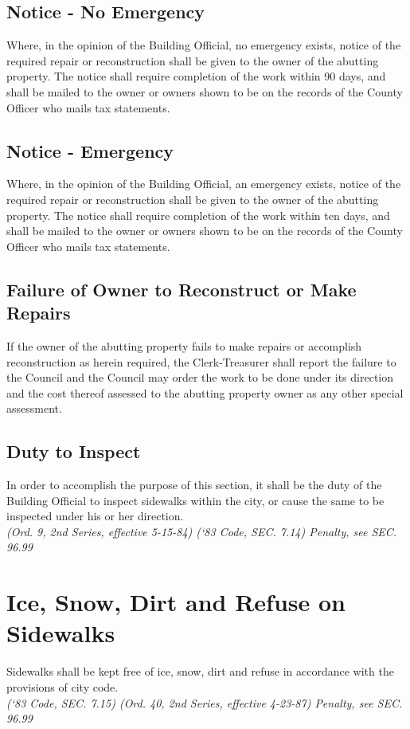 \subsection{Notice - No Emergency}
Where, in the opinion of the Building Official, no emergency exists, notice of the required repair or reconstruction shall be given to the owner of the abutting property.  The notice shall require completion of the work within 90 days, and shall be mailed to the owner or owners shown to be on the records of the County Officer who mails tax statements.
\subsection{Notice - Emergency}
Where, in the opinion of the Building Official, an emergency exists, notice of the required repair or reconstruction shall be given to the owner of the abutting property.  The notice shall require completion of the work within ten days, and shall be mailed to the owner or owners shown to be on the records of the County Officer who mails tax statements.
\subsection{Failure of Owner to Reconstruct or Make Repairs}
If the owner of the abutting property fails to make repairs or accomplish reconstruction as herein required, the Clerk-Treasurer shall report the failure to the Council and the Council may order the work to be done under its direction and the cost thereof assessed to the abutting property owner as any other special assessment.
\subsection{Duty to Inspect}
In order to accomplish the purpose of this section, it shall be the duty of the Building Official to inspect sidewalks within the city, or cause the same to be inspected under his or her direction.\\
\emph{(Ord. 9, 2nd Series, effective 5-15-84) (‘83 Code, SEC. 7.14)  Penalty, see SEC. 96.99}
\section{Ice, Snow, Dirt and Refuse on Sidewalks}
Sidewalks shall be kept free of ice, snow, dirt and refuse in accordance with the provisions of city code.\\
\emph{(‘83 Code, SEC. 7.15)  (Ord. 40, 2nd Series, effective 4-23-87)  Penalty, see SEC. 96.99}
